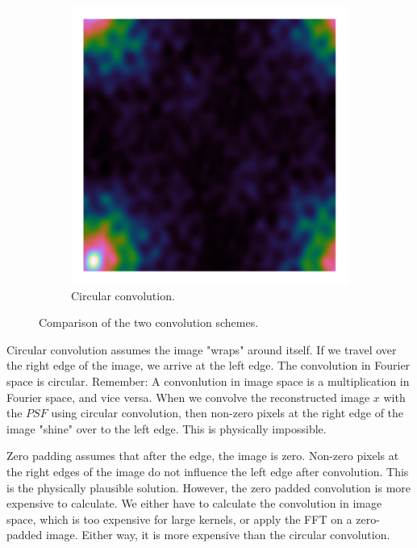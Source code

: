 \begin{figure}[h]
\begin{subfigure}[b]{0.3\linewidth}
		\includegraphics[width=\linewidth, clip, trim= 0.125in 0.125in 0.125in 0.125in]{./chapters/03.cd/simulated/psfCircular.png}
		\caption{Circular convolution.}
		\label{cd:efficient:convolution:circular}
	\end{subfigure}
	\caption{Comparison of the two convolution schemes.}
	\label{cd:efficient:convolution:figure}
\end{figure}

Circular convolution assumes the image "wraps" around itself. If we travel over the right edge of the image, we arrive at the left edge. The convolution in Fourier space is circular. Remember: A convonlution in image space is a multiplication in Fourier space, and vice versa. When we convolve the reconstructed image $x$ with the $PSF$ using circular convolution, then non-zero pixels at the right edge of the image "shine" over to the left edge. This is physically impossible.

Zero padding assumes that after the edge, the image is zero. Non-zero pixels at the right edges of the image do not influence the left edge after convolution. This is the physically plausible solution. However, the zero padded convolution is more expensive to calculate. We either have to calculate the convolution in image space, which is too expensive for large kernels, or apply the FFT on a zero-padded image. Either way, it is more expensive than the circular convolution.

